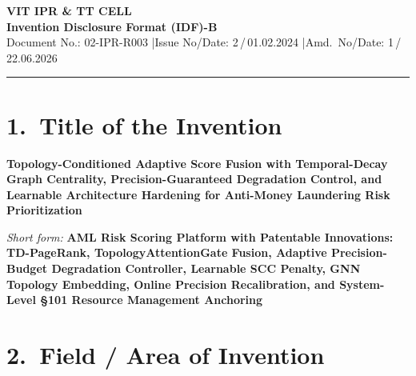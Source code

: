 \documentclass[12pt,a4paper]{article}
\begin{document}
\begin{center}
{\LARGE\bfseries VIT IPR \& TT CELL}\\[0.3cm]
{\Large\bfseries Invention Disclosure Format (IDF)-B}\\[0.4cm]
{\small Document No.: 02-IPR-R003 \quad|\quad Issue No/Date: 2\,/\,01.02.2024
        \quad|\quad Amd.\ No/Date: 1\,/\,22.06.2026}
\end{center}
\vspace{0.4cm}\hrule\vspace{0.6cm}

\section{1.\ Title of the Invention}

\textbf{Topology-Conditioned Adaptive Score Fusion with Temporal-Decay Graph
Centrality, Precision-Guaranteed Degradation Control, and Learnable
Architecture Hardening for Anti-Money Laundering Risk Prioritization}

\medskip
\textit{Short form:}
\textbf{AML Risk Scoring Platform with Patentable Innovations: TD-PageRank,
TopologyAttentionGate Fusion, Adaptive Precision-Budget Degradation Controller,
Learnable SCC Penalty, GNN Topology Embedding, Online Precision Recalibration,
and System-Level \S101 Resource Management Anchoring}

\section{2.\ Field / Area of Invention}
\end{document}

